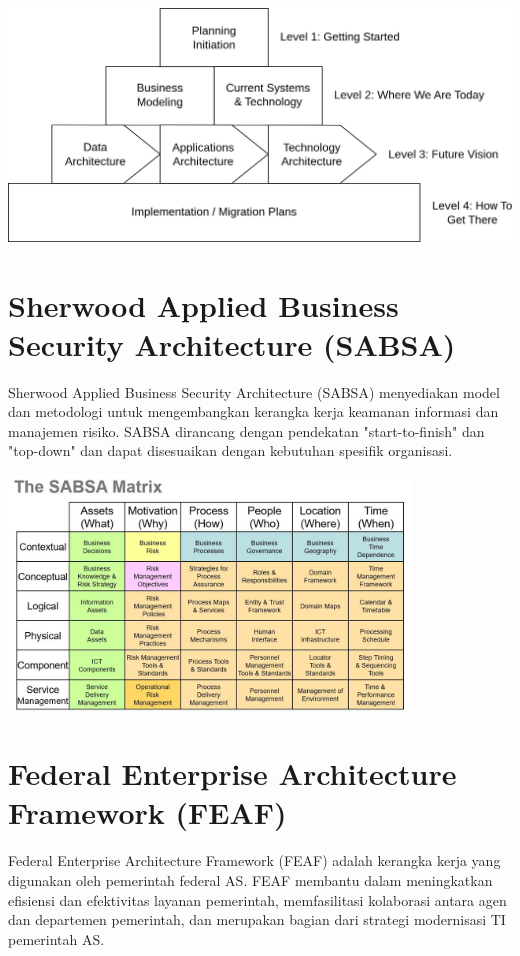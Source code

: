 \begin{center}
	\includegraphics[width=1\textwidth]{../figures/eap}
\end{center}

\section{Sherwood Applied Business Security Architecture (SABSA)}
Sherwood Applied Business Security Architecture (SABSA) menyediakan model dan metodologi untuk mengembangkan kerangka kerja keamanan informasi dan manajemen risiko. SABSA dirancang dengan pendekatan "start-to-finish" dan "top-down" dan dapat disesuaikan dengan kebutuhan spesifik organisasi.

\begin{center}
	\includegraphics[width=0.8\textwidth]{../figures/sabsa}
\end{center}

\section{Federal Enterprise Architecture Framework (FEAF)}
Federal Enterprise Architecture Framework (FEAF) adalah kerangka kerja yang digunakan oleh pemerintah federal AS. FEAF membantu dalam meningkatkan efisiensi dan efektivitas layanan pemerintah, memfasilitasi kolaborasi antara agen dan departemen pemerintah, dan merupakan bagian dari strategi modernisasi TI pemerintah AS.

